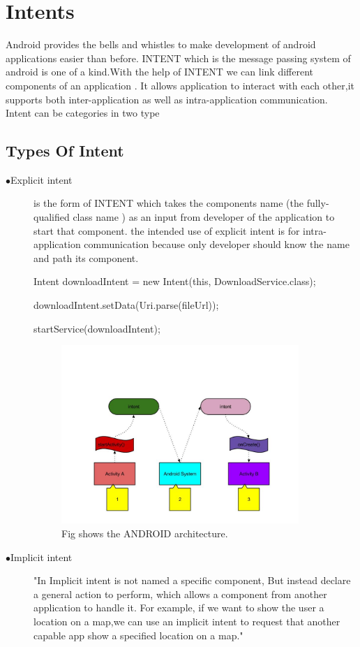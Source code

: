 \documentclass[11pt]{report}
\begin{document}
\section{Intents}
Android provides the bells and whistles to make development of android applications easier than before.
INTENT which is the message passing system of android is one of a kind.With the help of INTENT we can link different components of an application .
It allows application to interact with each other,it supports both inter-application as well as intra-application communication.\\
Intent can be categories in two type
\subsection{Types Of Intent}
\begin{description}
 \item[$\bullet$Explicit intent] is the form of INTENT which takes the components name (the fully-qualified class name ) as an input from developer of the application to start that component.
 the intended use of explicit intent is for intra-application communication because only developer should know the name and path its component.
\par
 Intent downloadIntent = new Intent(this, DownloadService.class);
 \par
 downloadIntent.setData(Uri.parse(fileUrl));
\par
startService(downloadIntent);
  \begin{figure}[ht!]
\centering
\includegraphics[width=90mm]{./images/impin.jpg}
\caption{ Fig shows the ANDROID architecture. \label{overflow}}
\end{figure}
 \item[$\bullet$Implicit intent]"In Implicit intent is not named a specific component, But instead declare a general action to perform, which allows a component from another application to handle it. For example,
 if we want to show the user a location on a map,we can use an implicit intent to request that another capable app show a specified location on a map."\cite{if}
 
 \end{description}
\end{document}
